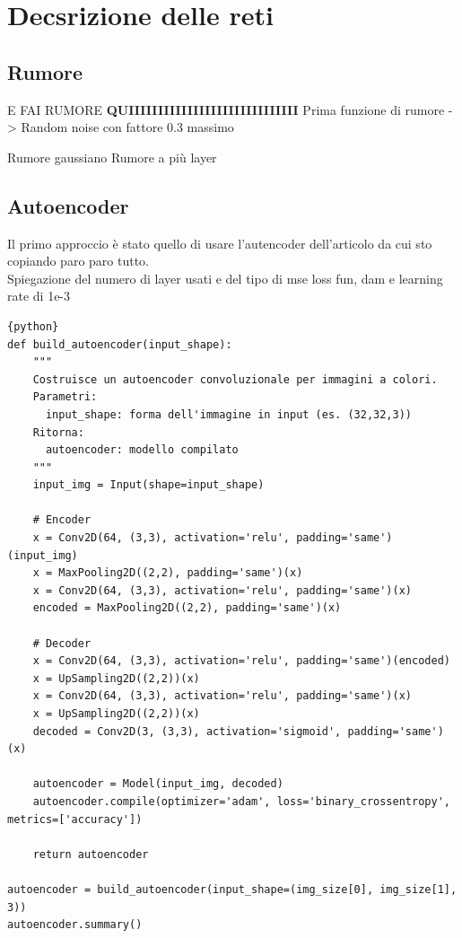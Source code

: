 \documentclass[12pt,a4paper,openright,twoside]{book}
\newcommand{\TODOComment}[1]{}
\begin{document}
\chapter{Decsrizione delle reti}
\section{Rumore}
E FAI RUMORE \textbf{QUIIIIIIIIIIIIIIIIIIIIIIIIIIIII}
Prima funzione di rumore -> Random noise con fattore 0.3 massimo
\TODOComment{questi 2 più avanti}
Rumore gaussiano 
Rumore a più layer


\section{Autoencoder}
Il primo approccio è stato quello di usare l'autencoder dell'articolo da cui sto copiando paro paro tutto.\\
Spiegazione del numero di layer usati e del tipo di mse loss fun, dam e learning rate di 1e-3
\begin{lstlisting}{python}
def build_autoencoder(input_shape):
    """
    Costruisce un autoencoder convoluzionale per immagini a colori.
    Parametri:
      input_shape: forma dell'immagine in input (es. (32,32,3))
    Ritorna:
      autoencoder: modello compilato
    """
    input_img = Input(shape=input_shape)

    # Encoder
    x = Conv2D(64, (3,3), activation='relu', padding='same')(input_img)
    x = MaxPooling2D((2,2), padding='same')(x)
    x = Conv2D(64, (3,3), activation='relu', padding='same')(x)
    encoded = MaxPooling2D((2,2), padding='same')(x)

    # Decoder
    x = Conv2D(64, (3,3), activation='relu', padding='same')(encoded)
    x = UpSampling2D((2,2))(x)
    x = Conv2D(64, (3,3), activation='relu', padding='same')(x)
    x = UpSampling2D((2,2))(x)
    decoded = Conv2D(3, (3,3), activation='sigmoid', padding='same')(x)

    autoencoder = Model(input_img, decoded)
    autoencoder.compile(optimizer='adam', loss='binary_crossentropy', metrics=['accuracy'])

    return autoencoder

autoencoder = build_autoencoder(input_shape=(img_size[0], img_size[1], 3))
autoencoder.summary()
\end{lstlisting}
\TODOComment{Modificare il dataset per i cosi successivi}
\end{document}
